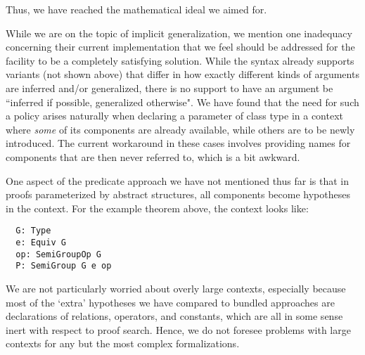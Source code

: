 \documentclass[a4paper,10pt,runningheads]{llncs}
\begin{document}
Thus, we have reached the mathematical ideal we aimed for.

While we are on the topic of implicit generalization, we mention one inadequacy concerning their current implementation that we feel should be addressed for the facility to be a completely satisfying solution. While the syntax already supports variants (not shown above) that differ in how exactly different kinds of arguments are inferred and/or generalized, there is no support to have an argument be ``inferred if possible, generalized otherwise". We have found that the need for such a policy arises naturally when declaring a parameter of class type in a context where \emph{some} of its components are already available, while others are to be newly introduced. The current workaround in these cases involves providing names for components that are then never referred to, which is a bit awkward.







One aspect of the predicate approach we have not mentioned thus far is that in proofs parameterized by abstract structures, all components become hypotheses in the context. For the example theorem above, the context looks like:
\begin{lstlisting}
  G: Type
  e: Equiv G
  op: SemiGroupOp G
  P: SemiGroup G e op
\end{lstlisting}
We are not particularly worried about overly large contexts, especially because most of the `extra' hypotheses we have compared to bundled approaches are declarations of relations, operators, and constants, which are all in some sense inert with respect to proof search. Hence, we do not foresee problems with large contexts for any but the most complex formalizations.
\end{document}
